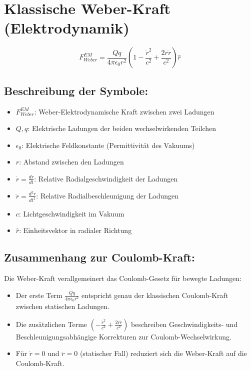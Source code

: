 \section{Klassische Weber-Kraft (Elektrodynamik)}
\[ F_{Weber}^{EM} = \frac{Qq}{4\pi\epsilon_0 r^2}\left(1 - \frac{\dot{r}^2}{c^2} + \frac{2r\ddot{r}}{c^2}\right)\hat{r} \]

\subsection*{Beschreibung der Symbole:}
\begin{itemize}
    \item $F_{Weber}^{EM}$: Weber-Elektrodynamische Kraft zwischen zwei Ladungen
    \item $Q, q$: Elektrische Ladungen der beiden wechselwirkenden Teilchen
    \item $\epsilon_0$: Elektrische Feldkonstante (Permittivität des Vakuums)
    \item $r$: Abstand zwischen den Ladungen
    \item $\dot{r} = \frac{dr}{dt}$: Relative Radialgeschwindigkeit der Ladungen
    \item $\ddot{r} = \frac{d^2r}{dt^2}$: Relative Radialbeschleunigung der Ladungen
    \item $c$: Lichtgeschwindigkeit im Vakuum
    \item $\hat{r}$: Einheitsvektor in radialer Richtung
\end{itemize}

\subsection*{Zusammenhang zur Coulomb-Kraft:}
Die Weber-Kraft verallgemeinert das Coulomb-Gesetz für bewegte Ladungen:
\begin{itemize}
    \item Der erste Term $\frac{Qq}{4\pi\epsilon_0 r^2}$ entspricht genau der klassischen Coulomb-Kraft zwischen statischen Ladungen.
    \item Die zusätzlichen Terme $\left(-\frac{\dot{r}^2}{c^2} + \frac{2r\ddot{r}}{c^2}\right)$ beschreiben Geschwindigkeits- und Beschleunigungsabhängige Korrekturen zur Coulomb-Wechselwirkung.
    \item Für $\dot{r} = 0$ und $\ddot{r} = 0$ (statischer Fall) reduziert sich die Weber-Kraft auf die Coulomb-Kraft.
\end{itemize}

